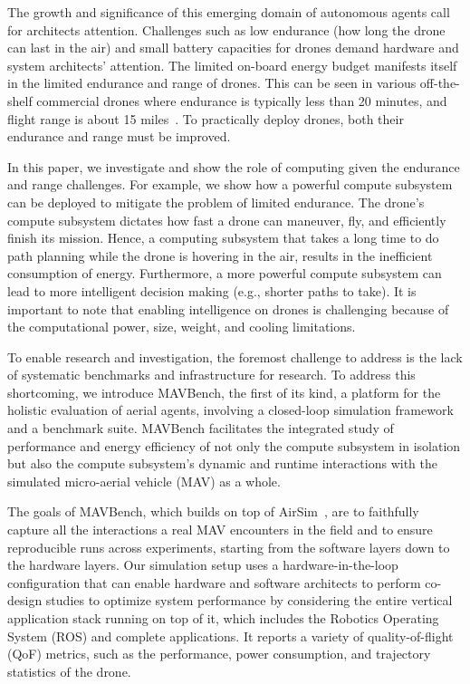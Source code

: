 
The growth and significance of this emerging domain of autonomous agents call for architects attention. Challenges such as low endurance (how long the drone can last in the air) and small battery capacities for drones demand hardware and system architects' attention. The limited on-board energy budget manifests itself in the limited endurance and range of drones. This can be seen in various off-the-shelf commercial drones where endurance is typically less than 20 minutes, and flight range is about 15 miles~\cite{CSD-Amazon-Drone-patents}. To practically deploy drones, both their endurance and range must be improved. 


In this paper, we investigate and show the role of computing given the endurance and range challenges. For example, we show how a powerful compute subsystem can be deployed to mitigate the problem of limited endurance. The drone's compute subsystem dictates how fast a drone can maneuver, fly, and efficiently finish its mission. Hence, a computing subsystem that takes a long time to do path planning while the drone is hovering in the air, results in the inefficient consumption of energy. Furthermore, a more powerful compute subsystem can lead to more intelligent decision making (e.g., shorter paths to take). It is important to note that enabling intelligence on drones is challenging because of the computational power, size, weight, and cooling limitations.


To enable research and investigation, the foremost challenge to address is the lack of systematic benchmarks and infrastructure for research. To address this shortcoming, we introduce MAVBench, the first of its kind, a platform for the holistic evaluation of aerial agents, involving a closed-loop simulation framework and a benchmark suite. MAVBench facilitates the integrated study of performance and energy efficiency of not only the compute subsystem in isolation but also the compute subsystem's dynamic and runtime interactions with the simulated micro-aerial vehicle (MAV) as a whole.


The goals of MAVBench, which builds on top of AirSim~\cite{Airsim_paper}, are to faithfully capture all the interactions a real MAV encounters in the field and to ensure reproducible runs across experiments, starting from the software layers down to the hardware layers. Our simulation setup uses a hardware-in-the-loop configuration that can enable hardware and software architects to perform co-design studies to optimize system performance by considering the entire vertical application stack running on top of it, which includes the Robotics Operating System (ROS) and complete applications. It reports a variety of quality-of-flight (QoF) metrics, such as the performance, power consumption, and trajectory statistics of the drone.


